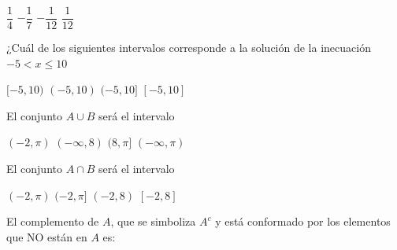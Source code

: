 \documentclass[10pt,letterpaper,addpoints]{exam}
\begin{document}
\begin{multicols}{2}
\begin{questions}
\begin{oneparchoices}
\choice $\dfrac{1}{4}$
\choice $-\dfrac{1}{7}$
\CorrectChoice $-\dfrac{1}{12}$
\choice $\dfrac{1}{12}$
\end{oneparchoices}
\question ¿Cuál de los siguientes intervalos corresponde a la solución de la inecuación $-5<x\leq 10$
\begin{choices}
\begin{multicols}{2}
\choice $[-5,10)$ 
\choice $(-5,10)$
\CorrectChoice $(-5,10]$
\choice $[-5,10]$
\end{multicols}
\end{choices}
\uplevel{Dados los conjuntos $A=(-2,8)$ y $B=(-\infty,\pi]$, responda las preguntas \ref{firstq1}--\ref{lastq1}}
\question \label{firstq1} El conjunto $A\cup B$ será el intervalo
\begin{choices}
\begin{multicols}{2}
 \choice $(-2,\pi)$
 \CorrectChoice $(-\infty,8)$
 \choice $(8,\pi]$
 \choice $(-\infty,\pi)$
\end{multicols}
\end{choices}
\question El conjunto $A \cap B $ será el intervalo
\begin{choices}
\begin{multicols}{2}
 \choice $(-2,\pi)$
 \CorrectChoice $(-2,\pi]$
 \choice $(-2,8)$
 \choice $[-2,8]$
\end{multicols}
\end{choices}
\question \label{lastq1} El complemento de $A$, que se simboliza $A^{c}$ y está conformado por los elementos que NO están en $A$ es:


\end{questions}
\end{multicols}
\end{document}
